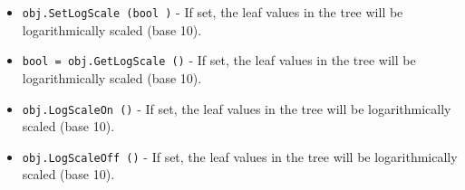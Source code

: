 \begin{itemize}
\item  \verb|obj.SetLogScale (bool )| -  If set, the leaf values in the tree will be logarithmically scaled (base 10).

\item  \verb|bool = obj.GetLogScale ()| -  If set, the leaf values in the tree will be logarithmically scaled (base 10).

\item  \verb|obj.LogScaleOn ()| -  If set, the leaf values in the tree will be logarithmically scaled (base 10).

\item  \verb|obj.LogScaleOff ()| -  If set, the leaf values in the tree will be logarithmically scaled (base 10).

\end{itemize}

